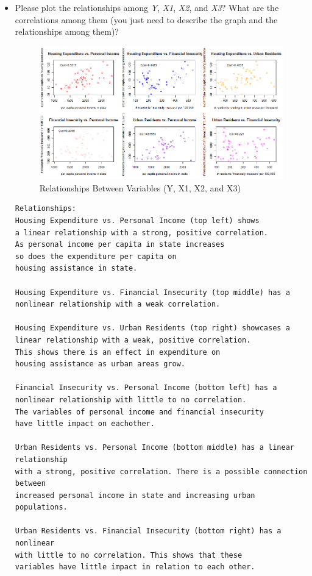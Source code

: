 \documentclass[12pt,letterpaper]{article}
\begin{document}
\begin{itemize}

\item
Please plot the relationships among \emph{Y}, \emph{X1}, \emph{X2}, and \emph{X3}? What are the correlations among them (you just need to describe the graph and the relationships among them)?
\begin{figure}[h!]\centering
	\caption{\footnotesize Relationships Between Variables (Y, X1, X2, and X3)}
	\label{fig:plot_1}
	\includegraphics[width=.85\textwidth]{all_relationships.png}
\end{figure}
\vspace{1cm}
\begin{Verbatim}
Relationships:
Housing Expenditure vs. Personal Income (top left) shows 
a linear relationship with a strong, positive correlation. 
As personal income per capita in state increases 
so does the expenditure per capita on 
housing assistance in state.

Housing Expenditure vs. Financial Insecurity (top middle) has a
nonlinear relationship with a weak correlation.

Housing Expenditure vs. Urban Residents (top right) showcases a
linear relationship with a weak, positive correlation. 
This shows there is an effect in expenditure on 
housing assistance as urban areas grow.

Financial Insecurity vs. Personal Income (bottom left) has a
nonlinear relationship with little to no correlation. 
The variables of personal income and financial insecurity 
have little impact on eachother.

Urban Residents vs. Personal Income (bottom middle) has a linear relationship 
with a strong, positive correlation. There is a possible connection between 
increased personal income in state and increasing urban populations.

Urban Residents vs. Financial Insecurity (bottom right) has a nonlinear 
with little to no correlation. This shows that these 
variables have little impact in relation to each other.


\end{Verbatim}
\end{itemize}
\end{document}
